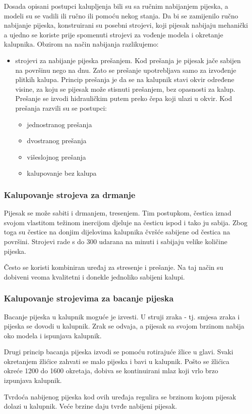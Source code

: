 \documentclass[a4paper,12pt]{article}
\numberwithin{figure}{section}
\begin{document}
Dosada opisani postupci kalupljenja bili su sa ručnim nabijanjem pijeska, a modeli su se vadili ili ručno ili pomoću nekog stanja. Da bi se zamijenilo ručno nabijanje pijeska, konstruirani su posebni strojevi, koji pijesak nabijaju mehanički a ujedno se koriste prije spomenuti strojevi za vođenje modela i okretanje kalupnika. Obzirom na način nabijanja razlikujemo:
\begin{itemize}
\item strojevi za nabijanje pijeska prešanjem. Kod prešanja je pijesak jače sabijen na površinu nego na dnu. Zato se prešanje upotrebljava samo za izvođenje plitkih kalupa. Princip prešanja je da se na kalupnik stavi okvir određene visine, za koju se pijesak može stisnuti prešanjem, bez opasnosti za kalup. Prešanje se izvodi hidrauličkim putem preko čepa koji ulazi u okvir. Kod prešanja razvili su se postupci:
\begin{itemize}
\item jednostranog prešanja
\item dvostranog prešanja
\item višeslojnog prešanja
\item kalupovanje bez kalupa
\end{itemize}
\end{itemize}
\subsubsection{Kalupovanje strojeva za drmanje}
Pijesak se može sabiti i drmanjem, tresenjem. Tim postupkom, čestica iznad svojom vlastitom težinom inercijom djeluje na česticu ispod i tako ju sabija. Zbog toga su čestice na donjim dijelovima kalupnika čvršće sabijene od čestica na površini. Strojevi rade s do 300 udarana na minuti i sabijaju velike količine pijeska. \par
Često se koristi kombiniran uređaj za stresenje i prešanje. Na taj način su dobiveni veoma kvalitetni i donekle jednoliko sabijeni kalupi.
\subsubsection{Kalupovanje strojevima za bacanje pijeska}
Bacanje pijeska u kalupnik moguće je izvesti. U struji zraka - tj. smjesa zraka i pijeska se dovodi u kalupnik. Zrak se odvaja, a pijesak sa svojom brzinom nabija oko modela i ispunjava kalupnik.\par
Drugi princip bacanja pijeska izvodi se pomoću rotirajuće žlice u glavi. Svaki okretanjem žlićice zahvati se malo pijeska i bavi u kalupnik. Pošto se žlićica okreće 1200 do 1600 okretaja, dobiva  se kontinuirani mlaz koji vrlo brzo izpunjava kalupnik.\par
Tvrdoća nabijenog pijeska kod ovih uređaja regulira se brzinom kojom pijesak dolazi u kalupnik. Veće brzine daju tvrđe nabijeni pijesak.
\end{document}
